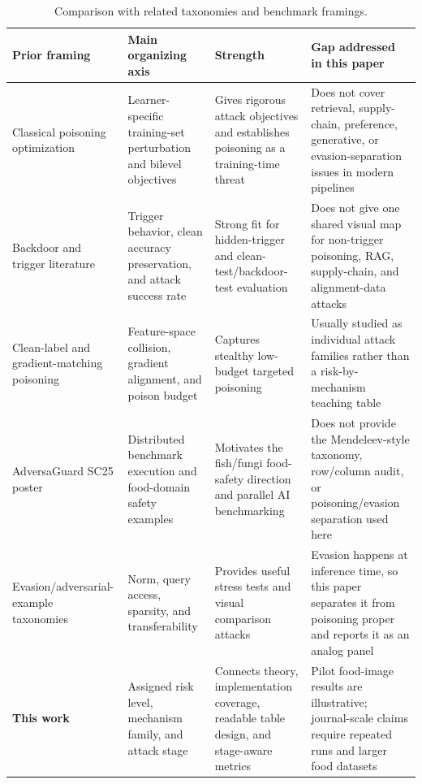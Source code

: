 \documentclass[conference]{IEEEtran}
\begin{document}
\begin{table}[t]
\centering
\caption{Comparison with related taxonomies and benchmark framings.}
\label{tab:taxcomparison}
\small
\begin{tabular}{p{}p{}p{}p{}}
\toprule
Prior framing & Main organizing axis & Strength & Gap addressed in this paper \\
\midrule
Classical poisoning optimization~\cite{biggio2012,mei2015} & Learner-specific training-set perturbation and bilevel objectives & Gives rigorous attack objectives and establishes poisoning as a training-time threat & Does not cover retrieval, supply-chain, preference, generative, or evasion-separation issues in modern pipelines \\
Backdoor and trigger literature~\cite{badnets,targetedbackdoor} & Trigger behavior, clean accuracy preservation, and attack success rate & Strong fit for hidden-trigger and clean-test/backdoor-test evaluation & Does not give one shared visual map for non-trigger poisoning, RAG, supply-chain, and alignment-data attacks \\
Clean-label and gradient-matching poisoning~\cite{poisonfrogs,witchesbrew} & Feature-space collision, gradient alignment, and poison budget & Captures stealthy low-budget targeted poisoning & Usually studied as individual attack families rather than a risk-by-mechanism teaching table \\
AdversaGuard SC25 poster~\cite{adversaguard} & Distributed benchmark execution and food-domain safety examples & Motivates the fish/fungi food-safety direction and parallel AI benchmarking & Does not provide the Mendeleev-style taxonomy, row/column audit, or poisoning/evasion separation used here \\
Evasion/adversarial-example taxonomies~\cite{deepfool,cw,hopskipjump} & Norm, query access, sparsity, and transferability & Provides useful stress tests and visual comparison attacks & Evasion happens at inference time, so this paper separates it from poisoning proper and reports it as an analog panel \\
\textbf{This work} & Assigned risk level, mechanism family, and attack stage & Connects theory, implementation coverage, readable table design, and stage-aware metrics & Pilot food-image results are illustrative; journal-scale claims require repeated runs and larger food datasets \\
\bottomrule
\end{tabular}
\end{table}
\end{document}
